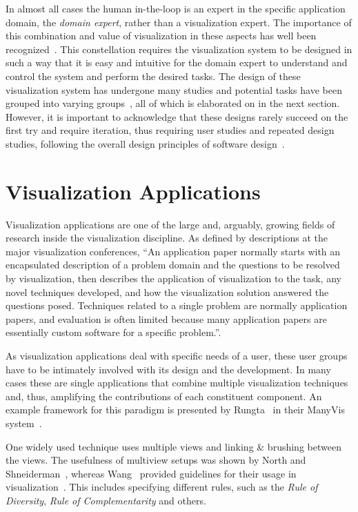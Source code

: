 In almost all cases the human in-the-loop is an expert in the specific application domain, the \emph{domain expert}, rather than a visualization expert.  The importance of this combination and value of visualization in these aspects has well been recognized~\cite{van2005value}.  This constellation requires the visualization system to be designed in such a way that it is easy and intuitive for the domain expert to understand and control the system and perform the desired tasks.  The design of these visualization system has undergone many studies and potential tasks have been grouped into varying groups~\cite{brehmer2014visualizing}, all of which is elaborated on in the next section.  However, it is important to acknowledge that these designs rarely succeed on the first try and require iteration, thus requiring user studies and repeated design studies, following the overall design principles of software design~\cite{victor2003iterative}.



\section{Visualization Applications} \label{cha:intro:appl}
Visualization applications are one of the large and, arguably, growing fields of research inside the visualization discipline.  As defined by descriptions at the major visualization conferences, ``An application paper normally starts with an encapsulated description of a problem domain and the questions to be resolved by visualization, then describes the application of visualization to the task, any novel techniques developed, and how the visualization solution answered the questions posed. Techniques related to a single problem are normally application papers, and evaluation is often limited because many application papers are essentially custom software for a specific problem.''.

As visualization applications deal with specific needs of a user, these user groups have to be intimately involved with its design and the development.  In many cases these are single applications that combine multiple visualization techniques and, thus, amplifying the contributions of each constituent component.  An example framework for this paradigm is presented by Rungta \etal\ in their ManyVis system~\cite{rungta2013manyvis}.

One widely used technique uses multiple views and linking \& brushing between the views.  The usefulness of multiview setups was shown by North and Shneiderman~\cite{north1997taxonomy}, whereas Wang \etal\ provided guidelines for their usage in visualization~\cite{wang2000guidelines}.  This includes specifying different rules, such as the \emph{Rule of Diversity}, \emph{Rule of Complementarity} and others.



